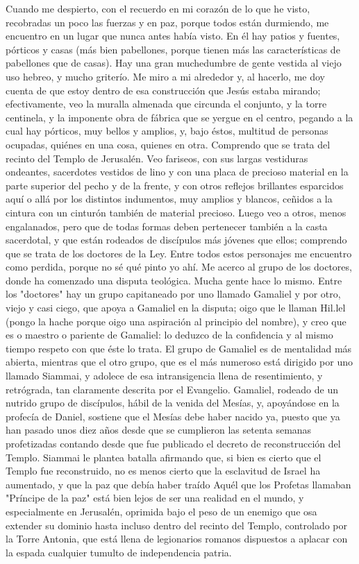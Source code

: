 \documentclass[12pt]{book} %
\begin{document}
Cuando me despierto, con el recuerdo en mi corazón de lo que he visto, recobradas un poco las fuerzas y en paz, porque todos están durmiendo, me encuentro en un lugar que nunca antes había visto. En él hay patios y fuentes, pórticos y casas (más bien pabellones, porque tienen más las características de pabellones que de casas). Hay una gran muchedumbre de gente vestida al viejo uso hebreo, y mucho griterío. Me miro a mi alrededor y, al hacerlo, me doy cuenta de que estoy dentro de esa construcción que Jesús estaba mirando; efectivamente, veo la muralla almenada que circunda el conjunto, y la torre centinela, y la imponente obra de fábrica que se yergue en el centro, pegando a la cual hay pórticos, muy bellos y amplios, y, bajo éstos, multitud de personas ocupadas, quiénes en una cosa, quienes en otra. 
Comprendo que se trata del recinto del Templo de Jerusalén. Veo fariseos, con sus largas vestiduras ondeantes, 
sacerdotes vestidos de lino y con una placa de precioso material en la parte superior del pecho y de la frente, y con otros reflejos brillantes esparcidos aquí o allá por los distintos indumentos, muy amplios y blancos, ceñidos a la cintura con un cinturón también de material precioso. Luego veo a otros, menos engalanados, pero que de todas formas deben pertenecer también a la casta sacerdotal, y que están rodeados de discípulos más jóvenes que ellos; comprendo que se trata de los doctores de la Ley. 
Entre todos estos personajes me encuentro como perdida, porque no sé qué pinto yo ahí. 
Me acerco al grupo de los doctores, donde ha comenzado una disputa teológica. Mucha gente hace lo mismo. 
Entre los "doctores" hay un grupo capitaneado por uno llamado Gamaliel y por otro, viejo y casi ciego, que apoya a Gamaliel en la disputa; oigo que le llaman Hil.lel (pongo la hache porque oigo una aspiración al principio del nombre), y creo que es o maestro o pariente de Gamaliel: lo deduzco de la confidencia y al mismo tiempo respeto con que éste lo trata. El grupo de Gamaliel es de mentalidad más abierta, mientras que el otro grupo, que es el más numeroso está dirigido por uno llamado Siammai, y adolece de esa intransigencia llena de resentimiento, y retrógrada, tan claramente descrita por el Evangelio. 
Gamaliel, rodeado de un nutrido grupo de discípulos, hábil de la venida del Mesías, y, apoyándose en la profecía de Daniel, sostiene que el Mesías debe haber nacido ya, puesto que ya han pasado unos diez años desde que se cumplieron las setenta semanas profetizadas contando desde que fue publicado el decreto de reconstrucción del Templo. Siammai le plantea batalla afirmando que, si bien es cierto que el Templo fue reconstruido, no es menos cierto que la esclavitud de Israel ha aumentado, y que la paz que debía haber traído Aquél que los Profetas llamaban "Príncipe de la paz" está bien lejos de ser una realidad en el mundo, y especialmente en Jerusalén, oprimida bajo el peso de un enemigo que osa extender su dominio hasta incluso dentro del recinto del Templo, controlado por la Torre Antonia, que está llena de legionarios romanos dispuestos a aplacar con la espada cualquier tumulto de independencia patria. 
\end{document}
